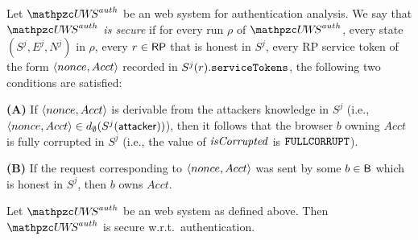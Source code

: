   \begin{definition}\label{def:uppresso-security-property} 
    Let $\uppressoauthwebsystem$ be an \uppresso web system for authentication analysis. 
    We say that \emph{$\uppressoauthwebsystem$ is secure} if for every run $\rho$ of
    $\uppressoauthwebsystem$, every state $(S^j, E^j, N^j)$ in $\rho$,
    every $r\in \mathsf{RP}$ that is honest in $S^j$, every RP service token of the form 
    $\langle {{}nonce, Acct} \rangle$ recorded in $S^j(r).\mathtt{serviceTokens}$, the following two conditions are
    satisfied:
  
    \textbf{(A)} If $\langle {{}nonce, Acct} \rangle$ is derivable from the attackers knowledge
    in $S^j$ (i.e., $\langle {{}nonce, Acct} \rangle \in d_{\emptyset}(S^j(\mathsf{attacker}))$),
    then it follows that the browser $b$ owning $Acct$ is fully corrupted
    in $S^j$ (i.e., the value of $\mathit{isCorrupted}$ is $\mathtt{FULLCORRUPT}$).
  
    \textbf{(B)} If the request corresponding to $\langle {{}nonce, Acct} \rangle$ was sent by
    some $b\in \mathsf{B}$ which is honest in $S^j$, then $b$ owns $Acct$.
  \end{definition}
  
  
  
  
  
  \begin{theorem}\label{thm:authentication}
    Let $\uppressoauthwebsystem$ be an \uppresso web system as
    defined above. Then $\uppressoauthwebsystem$ is secure
    w.r.t.~authentication.
  \end{theorem}
  
